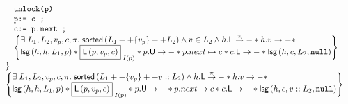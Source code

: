 \[\begin{array}{l}
\begin{array}{l}
\begin{array}{l}
			 	\command{unlock(p)}\\
			 	\command{p:= c ;}\\
			 	\command{c:= p.next ;}\\

				\left\{
			 	\begin{array}{@{} l @{}}
				 	\exsts{L_1, L_2, v_p, c, \pi} \sorted{L_1 ++ \{v_p\} ++ L_2} \land  v \in L_2 \land \lockT{h}[\pi] * \valueT{h}{v} * \\
					\lsg{h}{h}{L_1}{p} 
				 	* \shared{\lockedNode{p}{v_p}{c}}{I(p)} 
				 	* \unlockT{p} * \cell{p.next}{c} * \lockT{c}
				 	* \lsg{h}{c}{L_2}{\nil}
			 	
			 	\end{array}
			 	\right\}
		
			\end{array}
		
	\end{array}\\
	\}\\
	\left\{
 	\begin{array}{@{} l @{}}
	 	\exsts{L_1, L_2, v_p, c, \pi} \sorted{L_1 ++ \{v_p\} ++ v :: L_2}  \land \lockT{h}[\pi] * \valueT{h}{v} * \\
		\lsg{h}{h}{L_1}{p} 
	 	* \shared{\lockedNode{p}{v_p}{c}}{I(p)} 
	 	* \unlockT{p} * \cell{p.next}{c} * \lockT{c}
	 	* \lsg{h}{c}{v ::L_2}{\nil}
 	
 	\end{array}
 	\right\}

\end{array}
\]
%
%

